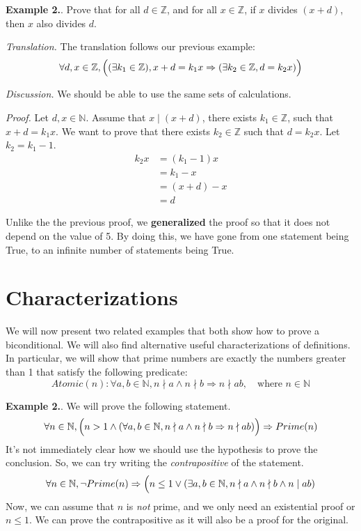 \documentclass{article}
\newcounter{excount}
\newcommand\ex{\stepcounter{excount} \textbf{Example 2.\theexcount}. }
\begin{document}
\ex Prove that for all $d \in \mathbb{Z}$, and for all $x \in \mathbb{Z}$, 
if $x$ divides $(x+d)$, then $x$ also divides $d$. 

\textit{Translation.} The translation follows our previous example:
$$\forall d, x \in \mathbb{Z}, \Bigl( (\exists k_1 \in \mathbb{Z}), 
x+d = k_1x \Rightarrow (\exists k_2 \in \mathbb{Z}, d = k_2x)\Bigr)$$

\textit{Discussion.} We should be able to use the same sets of calculations.

\textit{Proof.} Let $d, x \in \mathbb{N}$. Assume that $x \mid (x+d)$, there 
exists $k_1 \in \mathbb{Z}$, such that $x + d = k_1x$. We want to prove 
that there exists $k_2 \in \mathbb{Z}$ such that $d = k_2x$. Let $k_2 = k_1 - 1$.
\begin{align*}
    k_2x &= (k_1 -1)x \\
         &= k_1 -x \\
         &= (x+d) - x \\
         &= d
\end{align*}

Unlike the the previous proof, we \textbf{generalized} the proof so that it 
does not depend on the value of 5. By doing this, we have gone from one 
statement being True, to an infinite number of statements being True. 

\section{Characterizations}
We will now present two related examples that both show how to prove a 
biconditional. We will also find alternative useful characterizations of 
definitions. In particular, we will show that prime numbers are exactly the 
numbers greater than 1 that satisfy the following predicate: 
$$Atomic(n): \forall a, b \in \mathbb{N}, n \nmid a \land
n \nmid b \Rightarrow n \nmid ab, \quad \text{where } n \in \mathbb{N}$$

\ex We will prove the following statement.
$$\forall n \in \mathbb{N}, \Bigl( n > 1 \land (\forall a, b \in \mathbb{N}, 
n \nmid a \land n \nmid b \Rightarrow n \nmid ab) \Bigr) \Rightarrow Prime(n)$$
It's not immediately clear how we should use the hypothesis to prove the 
conclusion. So, we can try writing the \textit{contrapositive} of the statement. 
$$\forall n \in \mathbb{N}, \neg Prime(n) \Rightarrow \Bigl( n \leq 1 
    \lor (\exists a, b \in \mathbb{N}, n \nmid a \land n \nmid b \land 
    n \mid ab)$$
Now, we can assume that $n$ is \textit{not} prime, and we only need an 
existential proof or $n \leq 1$. We can prove the contrapositive as it will 
also be a proof for the original.
\end{document}
